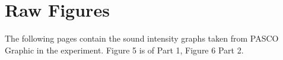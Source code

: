 \section{Raw Figures}
The following pages contain the sound intensity graphs taken from PASCO Graphic in the experiment. Figure 5 is of Part 1, Figure 6 Part 2.
\clearpage
\begin{figure}
	\centering
	 \hspace{40pt}
	\\

\end{figure}
